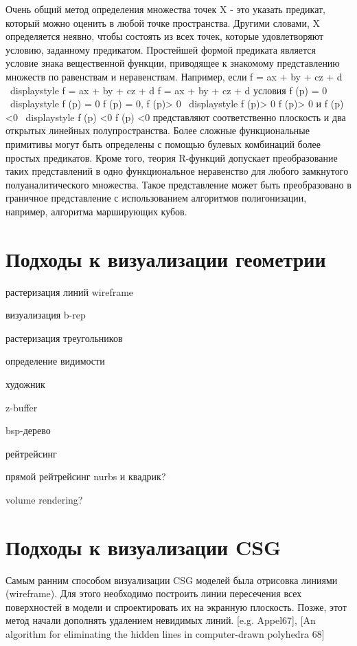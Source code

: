 Очень общий метод определения множества точек X - это указать предикат, который можно оценить в любой точке пространства. Другими словами, X определяется неявно, чтобы состоять из всех точек, которые удовлетворяют условию, заданному предикатом. Простейшей формой предиката является условие знака вещественной функции, приводящее к знакомому представлению множеств по равенствам и неравенствам. Например, если f = ax + by + cz + d {\ displaystyle f = ax + by + cz + d} f = ax + by + cz + d условия f (p) = 0 {\ displaystyle f (p) = 0} f (p) = 0, f (p)> 0 {\ displaystyle f (p)> 0} f (p)> 0 и f (p) <0 {\ displaystyle f (p) <0} f (p) <0 представляют соответственно плоскость и два открытых линейных полупространства. Более сложные функциональные примитивы могут быть определены с помощью булевых комбинаций более простых предикатов. Кроме того, теория R-функций допускает преобразование таких представлений в одно функциональное неравенство для любого замкнутого полуаналитического множества. Такое представление может быть преобразовано в граничное представление с использованием алгоритмов полигонизации, например, алгоритма марширующих кубов.

\section{Подходы к визуализации геометрии} \label{sect_geom_vis}


растеризация линий
wireframe

визуализация b-rep

растеризация треугольников

определение видимости

художник

z-buffer

bsp-дерево

рейтрейсинг

прямой рейтрейсинг nurbs и квадрик?

volume rendering?

\section{Подходы к визуализации CSG} \label{sect_csg_vis}



Самым ранним способом визуализации CSG моделей была отрисовка линиями (wireframe). Для этого необходимо построить линии пересечения всех поверхностей в модели и спроектировать их на экранную плоскость. Позже, этот метод начали дополнять удалением невидимых линий. [e.g. Appel67], [An algorithm for eliminating the hidden lines in computer-drawn polyhedra 68]

